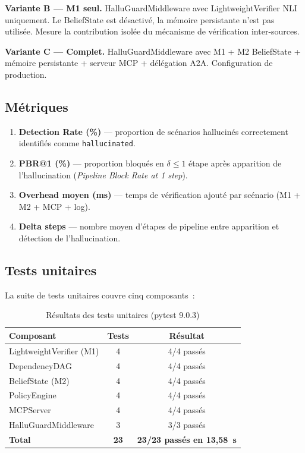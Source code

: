 \documentclass[12pt,a4paper]{article}
\begin{document}
\textbf{Variante B --- M1 seul.}
HalluGuardMiddleware avec LightweightVerifier NLI uniquement. Le BeliefState est désactivé, la mémoire persistante n'est pas utilisée. Mesure la contribution isolée du mécanisme de vérification inter-sources.

\textbf{Variante C --- Complet.}
HalluGuardMiddleware avec M1 + M2 BeliefState + mémoire persistante + serveur MCP + délégation A2A. Configuration de production.

\subsection{Métriques}

\begin{enumerate}[noitemsep]
  \item \textbf{Detection Rate (\%)} --- proportion de scénarios hallucinés correctement identifiés comme \texttt{hallucinated}.
  \item \textbf{PBR@1 (\%)} --- proportion bloqués en $\delta \leq 1$ étape après apparition de l'hallucination (\textit{Pipeline Block Rate at 1 step}).
  \item \textbf{Overhead moyen (ms)} --- temps de vérification ajouté par scénario (M1 + M2 + MCP + log).
  \item \textbf{Delta steps} --- nombre moyen d'étapes de pipeline entre apparition et détection de l'hallucination.
\end{enumerate}

\subsection{Tests unitaires}

La suite de tests unitaires couvre cinq composants~:

\begin{table}[H]
\centering
\caption{Résultats des tests unitaires (pytest 9.0.3)}
\label{tab:tests}
\begin{tabular}{lcc}
\toprule
\textbf{Composant} & \textbf{Tests} & \textbf{Résultat} \\
\midrule
LightweightVerifier (M1) & 4 & \textcolor{green!60!black}{4/4 passés} \\
DependencyDAG & 4 & \textcolor{green!60!black}{4/4 passés} \\
BeliefState (M2) & 4 & \textcolor{green!60!black}{4/4 passés} \\
PolicyEngine & 4 & \textcolor{green!60!black}{4/4 passés} \\
MCPServer & 4 & \textcolor{green!60!black}{4/4 passés} \\
HalluGuardMiddleware & 3 & \textcolor{green!60!black}{3/3 passés} \\
\midrule
\textbf{Total} & \textbf{23} & \textbf{23/23 passés en 13,58~s} \\
\bottomrule
\end{tabular}
\end{table}
\end{document}
